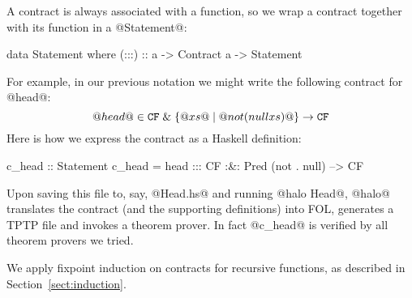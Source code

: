A contract is always associated with a function, so we wrap a contract
together with its function in a @Statement@:
\begin{code}
data Statement where
    (:::) :: a -> Contract a -> Statement
\end{code}
For example, in our previous notation we might write the following
contract for @head@:
$$
@head@ \in {\tt CF} \;\&\; \{@xs@ \mid @not (null xs)@ \} \rightarrow {\tt CF}
$$
Here is how we express the contract as a Haskell definition:
\begin{comment}
head (x:xs) = x
head []     = error "empty list"

not True = False    null [] = True
not False = True    null xs = False

f . g = \x -> f (g x)
\end{comment}
\begin{code}
c_head :: Statement
c_head = head ::: CF :&: Pred (not . null) --> CF
\end{code}
Upon saving this file to, say, @Head.hs@ and running @halo Head@,
@halo@ translates the contract (and the supporting definitions) into
FOL, generates a TPTP file and invokes a theorem prover.
In fact @c_head@ is verified by all theorem provers we tried.

We apply fixpoint induction on contracts for recursive functions, as
described in Section~\ref{sect:induction}.

